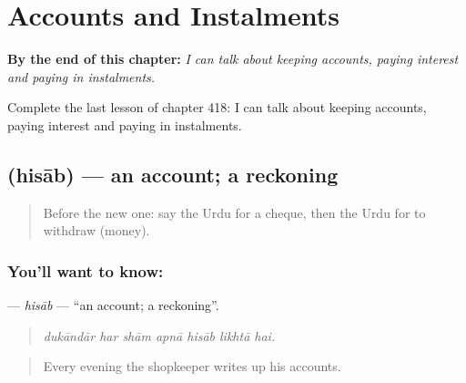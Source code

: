
\chapter{Accounts and Instalments}
\label{ch:ur-accounts-and-instalments}

\begin{chapteropening}
\textbf{By the end of this chapter:} \emph{I can talk about keeping accounts, paying interest and paying in instalments.}

Complete the last lesson of chapter 418: I can talk about keeping accounts, paying interest and paying in instalments.
\end{chapteropening}

\section[\texorpdfstring{\ur{حساب} (hisāb)}{حساب (hisāb)}]{ (hisāb) — an account; a reckoning}

\label{lesson:UR-C418-hisab}



\begin{quote}
Before the new one: say the Urdu for a cheque, then the Urdu for to withdraw (money).
\end{quote}

\subsection*{You'll want to know: }
\textbf{} — \emph{hisāb} — \textquotedblleft{}an account; a reckoning\textquotedblright{}.

\begin{quote}
      
\end{quote}

\begin{quote}
\emph{dukāndār har shām apnā hisāb likhtā hai.}
\end{quote}

\begin{quote}
Every evening the shopkeeper writes up his accounts.
\end{quote}

